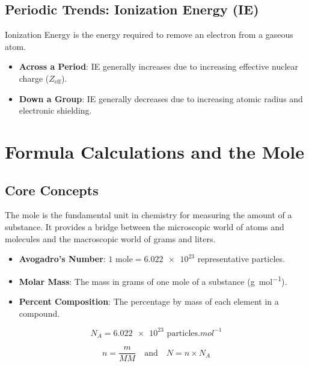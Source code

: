 \documentclass[11pt]{article}
\begin{document}
\subsection{Periodic Trends: Ionization Energy (IE)}
Ionization Energy is the energy required to remove an electron from a gaseous atom.
\begin{itemize}
    \item \textbf{Across a Period}: IE generally increases due to increasing effective nuclear charge ($Z_{\text{eff}}$).
    \item \textbf{Down a Group}: IE generally decreases due to increasing atomic radius and electronic shielding.
\end{itemize}

\newpage

\section{Formula Calculations and the Mole}

\subsection{Core Concepts}
The mole is the fundamental unit in chemistry for measuring the amount of a substance. It provides a bridge between the microscopic world of atoms and molecules and the macroscopic world of grams and liters.

\begin{itemize}[noitemsep]
    \item \textbf{Avogadro's Number}: $1 \text{ mole} = \num{6.022e23}$ representative particles.
    \item \textbf{Molar Mass}: The mass in grams of one mole of a substance (\si{g.mol^{-1}}).
    \item \textbf{Percent Composition}: The percentage by mass of each element in a compound.
\end{itemize}

\begin{tcolorbox}[provided, title=Avogadro Constant (Provided)]
    \[ N_A = \num{6.022e23} \si{\text{ particles}.mol^{-1}} \]
\end{tcolorbox}

\begin{tcolorbox}[memorize, title=Mole Calculations (Must Memorize)]
    \[ n = \frac{m}{MM} \quad \text{and} \quad N = n \times N_A \]
\end{tcolorbox}
\end{document}

